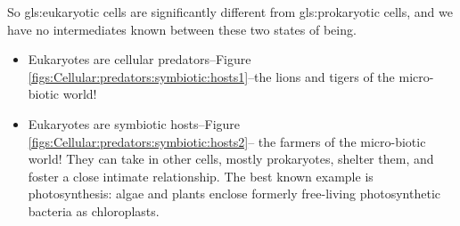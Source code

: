 \documentclass[]{article}
\begin{document}
So \gls{gls:eukaryotic} cells are significantly different from \gls{gls:prokaryotic} cells, and we have no intermediates known between these two states of being.

\begin{itemize}
	\item Eukaryotes are cellular predators--Figure \ref{figs:Cellular:predators:symbiotic:hosts1}--the lions and tigers of the micro-biotic world!
	\item Eukaryotes are symbiotic hosts--Figure \ref{figs:Cellular:predators:symbiotic:hosts2}-- the farmers of the micro-biotic world! They can take in other cells, mostly prokaryotes, shelter them, and foster a close intimate relationship. The best known example is photosynthesis: algae and plants enclose formerly free-living photosynthetic bacteria as chloroplasts.
\end{itemize}
\end{document}
